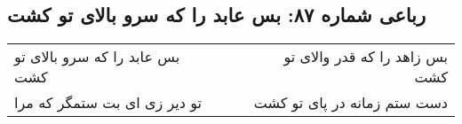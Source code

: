 \begin{center}
\section*{رباعی شماره ۸۷: بس عابد را که سرو بالای تو کشت}
\label{sec:sh087}
\begin{longtable}{l p{0.5cm} r}
بس عابد را که سرو بالای تو کشت
&&
بس زاهد را که قدر والای تو کشت
\\
تو دیر زی ای بت ستمگر که مرا
&&
دست ستم زمانه در پای تو کشت
\\
\end{longtable}
\end{center}
